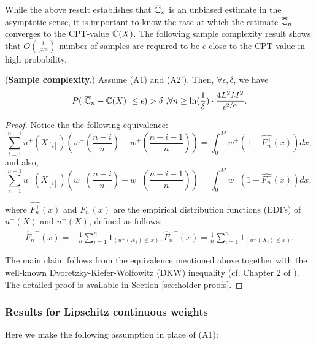 While the above result establishes that $\overline {\mathbb{C}}_n$ is an unbiased estimate in the asymptotic sense, it is important to know the rate at which the estimate $\overline {\mathbb{C}}_n$ converges to the CPT-value $\mathbb{C}(X)$. 
The following sample complexity result shows that $O\left(\frac{1}{\epsilon^{2/\alpha}}\right)$ number of samples are required to be $\epsilon$-close to the CPT-value in high probability.

% 

\begin{proposition}(\textbf{Sample complexity.})
\label{prop:holder-dkw}
Assume (A1) and (A2'). Then, $\forall \epsilon, \delta$, we have
$$
P(\left |\overline {\mathbb{C}}_n- \mathbb{C}(X) \right| \leq  \epsilon ) > \delta\text{     ,} \forall n \geq \ln(\frac{1}{\delta})\cdot 
\frac{4L^2 M^2}{\epsilon^{2/\alpha}}.$$
\end{proposition}
\begin{proof}
Notice the the following equivalence:
$$\sum_{i=1}^{n-1} u^+(X_{[i]}) (w^+(\frac{n-i}{n}) - w^+(\frac{n-i-1}{n})) =  \int_0^M w^+(1-\widehat{F^+_n}(x)) dx, $$
and also,
$$\sum_{i=1}^{n-1} u^-(X_{[i]}) (w^-(\frac{n-i}{n}) - w^-(\frac{n-i-1}{n})) =  \int_0^M w^-(1-\widehat{F^-_n}(x)) dx, $$

where $\widehat{F^+_n}(x)$ and $\widehat{F^-_n}(x)$ are the empirical distribution functions (EDFs) of $u^+(X)$
and $u^-(X)$, defined as follows:
\begin{align}
{\widehat F_n}^+(x)=&\frac{1}{n} \sum_{i=1}^n 1_{(u^+(X_i) \leq x)}, 
{\widehat F_n}^-(x)=\frac{1}{n} \sum_{i=1}^n 1_{(u^-(X_i) \leq x)}.
\label{eq:edf}
\end{align}

The main claim follows from the equivalence mentioned above together with the well-known Dvoretzky-Kiefer-Wolfowitz (DKW) inequality (cf. Chapter 2 of \cite{wasserman2006}).
The detailed proof is available in Section \ref{sec:holder-proofs}.
\end{proof}

\subsubsection{Results for Lipschitz continuous weights}
Here we make the following assumption in place of (A1):
 
